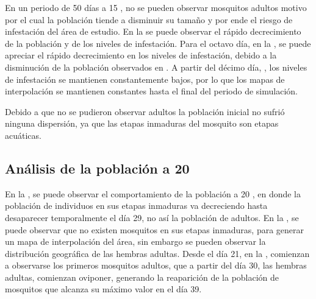 En un periodo de 50 días a 15 \textcelsius, no se pueden observar mosquitos adultos motivo por el
cual la población tiende a disminuir su tamaño y por ende el riesgo de infestación del área de
estudio. En la  se puede observar el rápido decrecimiento de la
población y de los niveles de infestación. Para el octavo día, en la
, se puede apreciar el rápido decrecimiento en los niveles de
infestación, debido a la disminución de la población observados en
. A partir del décimo día,
, los niveles de infestación se mantienen constantemente
bajos, por lo que los mapas de interpolación se mantienen constantes hasta el final del periodo de
simulación.

Debido a que no se pudieron observar adultos la población inicial no sufrió ninguna dispersión, ya
que las etapas inmaduras del mosquito son etapas acuáticas.

\subsection{Análisis de la población a 20\textcelsius}
En la , se puede observar el comportamiento de la población a
20 \textcelsius, en donde la población de individuos en sus etapas inmaduras va decreciendo hasta
desaparecer temporalmente el día 29, no así la población de adultos. En la
, se puede observar que no existen mosquitos en sus etapas
inmaduras, para generar un mapa de interpolación del área, sin embargo se pueden observar la
distribución geográfica de las hembras adultas. Desde el día 21, en la
, comienzan a observarse los primeros mosquitos adultos, que a
partir del día 30, las hembras adultas, comienzan oviponer, generando la reaparición de la
población de mosquitos que alcanza su máximo valor en el día 39.

